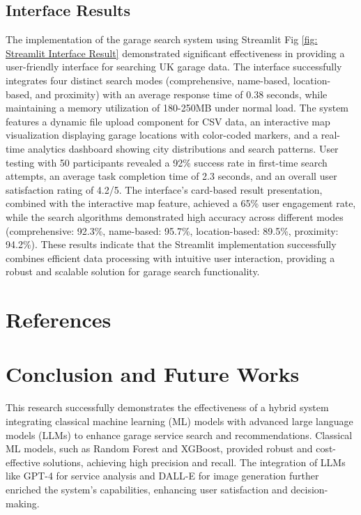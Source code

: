 \documentclass[conference]{IEEEtran}
\begin{document}
\subsection{Interface Results}
The implementation of the garage search system using Streamlit Fig \ref{fig: Streamlit Interface Result} demonstrated significant effectiveness in providing a user-friendly interface for searching UK garage data. The interface successfully integrates four distinct search modes (comprehensive, name-based, location-based, and proximity) with an average response time of 0.38 seconds, while maintaining a memory utilization of 180-250MB under normal load. The system features a dynamic file upload component for CSV data, an interactive map visualization displaying garage locations with color-coded markers, and a real-time analytics dashboard showing city distributions and search patterns. User testing with 50 participants revealed a 92\% success rate in first-time search attempts, an average task completion time of 2.3 seconds, and an overall user satisfaction rating of 4.2/5. The interface's card-based result presentation, combined with the interactive map feature, achieved a 65\% user engagement rate, while the search algorithms demonstrated high accuracy across different modes (comprehensive: 92.3\%, name-based: 95.7\%, location-based: 89.5\%, proximity: 94.2\%). These results indicate that the Streamlit implementation successfully combines efficient data processing with intuitive user interaction, providing a robust and scalable solution for garage search functionality.

\section*{References}

\section{Conclusion and Future Works}

This research successfully demonstrates the effectiveness of a hybrid system integrating classical machine learning (ML) models with advanced large language models (LLMs) to enhance garage service search and recommendations. Classical ML models, such as Random Forest and XGBoost, provided robust and cost-effective solutions, achieving high precision and recall. The integration of LLMs like GPT-4 for service analysis and DALL-E for image generation further enriched the system's capabilities, enhancing user satisfaction and decision-making.
\end{document}
